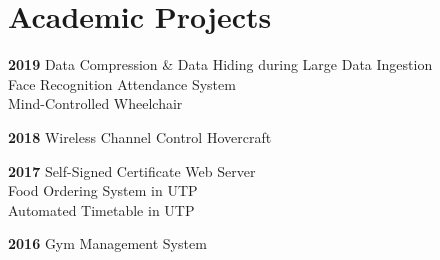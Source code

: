 \section{Academic Projects}
\vspace{-0.2cm}
\textbf{2019}
    \vspace{0.1mm} {\quad \quad Data Compression \& Data Hiding during Large Data Ingestion} \\
    \vspace{0.1mm} {\quad \quad \quad \quad Face Recognition Attendance System} \\
    \vspace{0.1mm} {\quad \quad \quad \quad Mind-Controlled Wheelchair} 
    
\textbf{2018}
    \vspace{0.1mm} {\quad \quad Wireless Channel Control Hovercraft}    
 
\textbf{2017}
    \vspace{0.1mm} {\quad \quad Self-Signed Certificate Web Server} \\
    \vspace{0.1mm} {\quad \quad \quad \quad Food Ordering System in UTP} \\
    \vspace{0.1mm} {\quad \quad \quad \quad Automated Timetable in UTP} 
    
\textbf{2016}   
    \vspace{0.1mm} {\quad \quad Gym Management System}\\
    